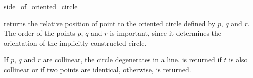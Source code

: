 \begin{ccRefFunction}{side_of_oriented_circle}

         {returns the relative position of point 
          to the oriented circle defined by $p$, $q$ and $r$.
	  The order of the points $p$, $q$ and $r$ is important,
	  since it determines the orientation of the implicitly
          constructed circle.

If $p$, $q$ and $r$ are collinear, the circle degenerates in a line.
 is returned if $t$ is also collinear or if two
points are identical, 
otherwise,  is returned.
}

\ccSeeAlso

 \\

\end{ccRefFunction}

